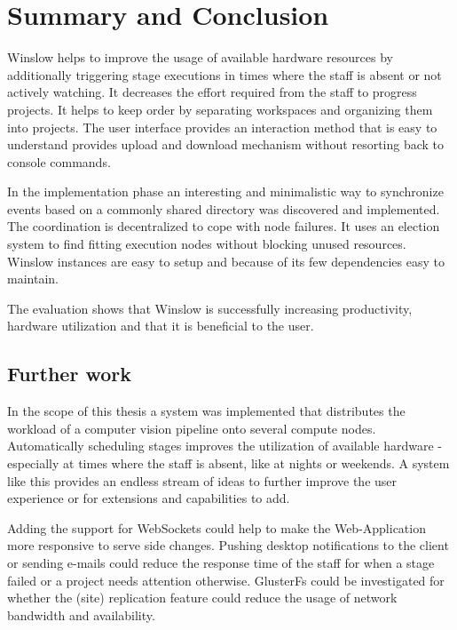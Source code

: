 \chapter{Summary and Conclusion}

Winslow helps to improve the usage of available hardware resources by additionally triggering stage executions in times where the staff is absent or not actively watching.
It decreases the effort required from the staff to progress projects.
It helps to keep order by separating workspaces and organizing them into projects.
The user interface provides an interaction method that is easy to understand provides upload and download mechanism without resorting back to console commands.

In the implementation phase an interesting and minimalistic way to synchronize events based on a commonly shared directory was discovered and implemented.
The coordination is decentralized to cope with node failures.
It uses an election system to find fitting execution nodes without blocking unused resources.
Winslow instances are easy to setup and because of its few dependencies easy to maintain.


The evaluation shows that Winslow is successfully increasing productivity, hardware utilization and that it is beneficial to the user.


\pagebreak
\section{Further work}


In the scope of this thesis a system was implemented that distributes the workload of a computer vision pipeline onto several compute nodes.
Automatically scheduling stages improves the utilization of available hardware - especially at times where the staff is absent, like at nights or weekends.
A system like this provides an endless stream of ideas to further improve the user experience or for extensions and capabilities to add.

Adding the support for WebSockets could help to make the Web-Application more responsive to serve side changes.
Pushing desktop notifications to the client or sending e-mails could reduce the response time of the staff for when a stage failed or a project needs attention otherwise.
GlusterFs could be investigated for whether the (site) replication feature could reduce the usage of network bandwidth and availability.
